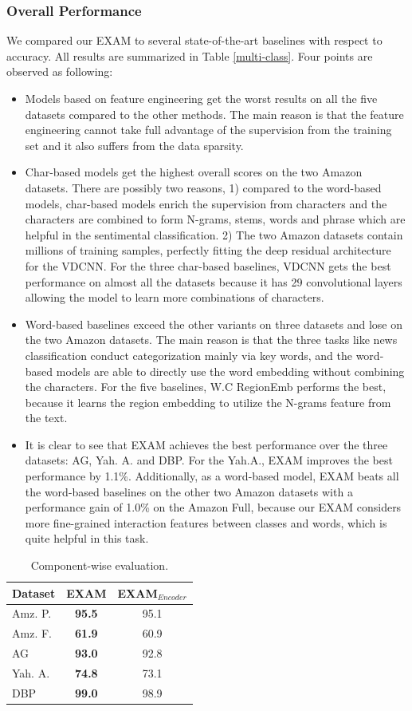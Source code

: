 \documentclass[letterpaper]{article} %
\begin{document}
\subsubsection{Overall Performance}
We compared our EXAM to several state-of-the-art baselines with respect to accuracy. All results are summarized in Table \ref{multi-class}. Four points are observed as following:
\begin{itemize}
\item Models based on feature engineering get the worst results on all the five datasets compared to the other methods. The main reason is that the feature engineering cannot take full advantage of the supervision from the training set and it also suffers from the data sparsity.
\item Char-based models get the highest overall scores on the two Amazon datasets. There are possibly two reasons, 1) compared to the word-based models, char-based models enrich the supervision from characters and the characters are combined to form N-grams, stems, words and phrase which are helpful in the sentimental classification. 2) The two Amazon datasets contain millions of training samples, perfectly fitting the deep residual architecture for the VDCNN. For the three char-based baselines, VDCNN gets the best performance on almost all the datasets because it has 29 convolutional layers allowing the model to learn more combinations of characters.
\item Word-based baselines exceed the other variants on three datasets and lose on the two Amazon datasets. The main reason is that the three tasks like news classification conduct categorization mainly via key words, and the word-based models are able to directly use the word embedding without combining the characters. For the five baselines, W.C RegionEmb performs the best, because it learns the region embedding to utilize the N-grams feature from the text.
\item It is clear to see that EXAM achieves the best performance over the three datasets: AG, Yah. A. and DBP. For the Yah.A., EXAM improves the best performance by 1.1\%. Additionally, as a word-based model, EXAM beats all the word-based baselines on the other two Amazon datasets with a performance gain of 1.0\% on the Amazon Full, because our EXAM considers more fine-grained interaction features between classes and words, which is quite helpful in this task.
\end{itemize}
\begin{table}
  \caption{Component-wise evaluation.}
  \label{componment}
  \centering
  \begin{tabular}{lcc}
    \toprule
     Dataset & EXAM & EXAM$_{Encoder}$\\
         \midrule
     Amz. P. & \textbf{95.5}  &95.1 \\
     Amz. F. & \textbf{61.9} &60.9 \\
     AG      &\textbf{93.0}  & 92.8\\
     Yah. A. &\textbf{74.8}  &73.1\\
     DBP     &\textbf{99.0} &98.9 \\
    \bottomrule
  \end{tabular}
\end{table}
\end{document}

